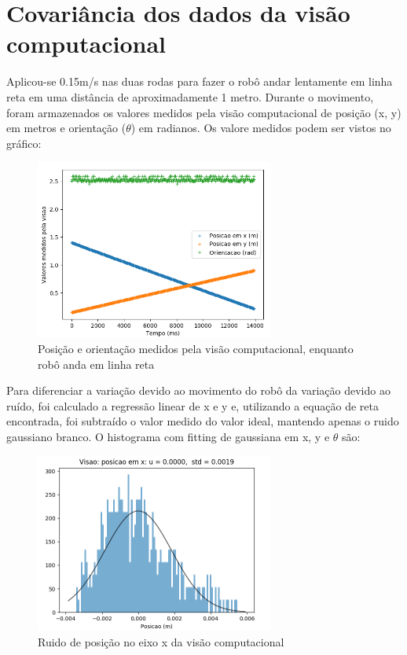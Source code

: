 \documentclass[
	12pt,				%
	openright,			%
	twoside,			%
	convert,
	a4paper,			%
	english,			%
	french,				%
	spanish,			%
	brazil				%
	]{abntex2}
\begin{document}
\section{Covariância dos dados da visão computacional}
Aplicou-se 0.15m/s nas duas rodas para fazer o robô andar lentamente em linha reta em uma distância de aproximadamente 1 metro. Durante o movimento, foram armazenados os valores medidos pela visão computacional de posição (x, y) em metros e orientação ($\theta$) em radianos. Os valore medidos podem ser vistos no gráfico:
\begin{figure}[H]
	\caption{Posição e orientação medidos pela visão computacional, enquanto robô anda em linha reta}
\begin{center}
   \includegraphics[width=0.7\textwidth]{visao}
\end{center}
\end{figure}
Para diferenciar a variação devido ao movimento do robô da variação devido ao ruído, foi calculado a regressão linear de x e y e, utilizando a equação de reta encontrada, foi subtraído o valor medido do valor ideal, mantendo apenas o ruido gaussiano branco. O histograma com fitting de gaussiana em x, y e $\theta$ são:
\begin{figure}[H]
	\caption{Ruido de posição no eixo x da visão computacional}
\begin{center}
   \includegraphics[width=0.7\textwidth]{visao_x_gaussiana}
\end{center}
\end{figure}
\end{document}
